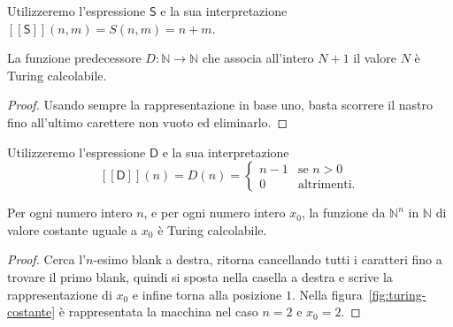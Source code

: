\noindent Utilizzeremo l'espressione $\mathsf S$ e la sua interpretazione $[[\mathsf S]](n,m)=S(n,m)=n+m$.

\begin{lemm}
La funzione predecessore $D\colon\mathbb N\to\mathbb N$ che 
associa all'intero $N+1$ il valore $N$ è Turing calcolabile.
\end{lemm}

\begin{proof}
Usando sempre la rappresentazione in base uno, basta scorrere il nastro fino all'ultimo carettere non vuoto ed eliminarlo.
\end{proof}

\noindent Utilizzeremo l'espressione $\mathsf D$ e la sua interpretazione
\[
[[\mathsf D]](n)=D(n)=\begin{cases}n-1 & \text{se } n>0\\ 0 & \text{altrimenti.}\end{cases}
\]

\begin{lemm}
Per ogni numero intero $n$, e per ogni numero intero $x_0$, la funzione da $\mathbb N^n$ in $\mathbb N$ di valore costante uguale a $x_0$ è Turing calcolabile.
\end{lemm}

\begin{proof}
Cerca l'$n$-esimo blank a destra, ritorna cancellando tutti i caratteri fino a trovare il primo blank, quindi si sposta nella casella a destra e scrive la rappresentazione di $x_0$ e infine torna alla posizione $1$. Nella figura~\ref{fig:turing-costante} è rappresentata la macchina nel caso $n=2$ e $x_0=2$.
\end{proof}


